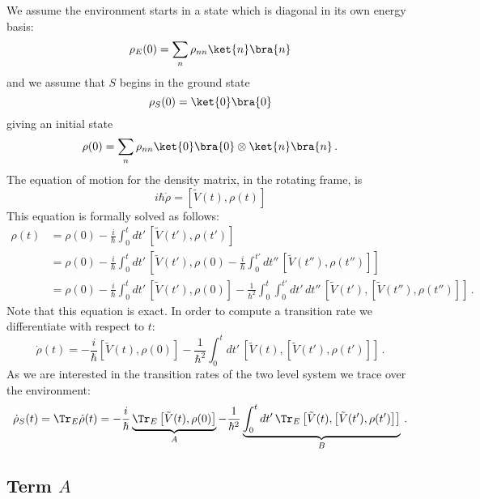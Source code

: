 We assume the environment starts in a state which is diagonal in its own energy basis:
\begin{equation}
\rho_E(0) = \sum_n \rho_{nn} \ket{n}\bra{n}
\end{equation}
and we assume that $S$ begins in the ground state
\begin{equation}
\rho_S(0) = \ket{0}\bra{0}
\end{equation}
giving an initial state
\begin{equation}
\rho(0) = \sum_n \rho_{nn} \ket{0}\bra{0} \otimes \ket{n}\bra{n} \, .
\end{equation}
The equation of motion for the density matrix, in the rotating frame, is
\begin{equation}
i \hbar \dot{\rho} = \left[ \tilde{V}(t), \rho(t) \right]
\end{equation}
This equation is formally solved as follows:
\begin{align}
\rho(t)
&= \rho(0) - \frac{i}{\hbar}
\int_0^t dt' \, \left[ \tilde{V}(t'), \rho(t') \right] \\
&= \rho(0) - \frac{i}{\hbar}
\int_0^t dt' \, \left[ \tilde{V}(t'), \rho(0) - \frac{i}{\hbar} \int_0^{t'} dt'' \, \left[ \tilde{V}(t''), \rho(t'') \right] \right] \\
&= \rho(0) - \frac{i}{\hbar} \int_0^{t} dt' \, \left[ \tilde{V}(t'), \rho(0) \right]
- \frac{1}{\hbar^2} \int_0^{t} \int_0^{t'} dt' \, dt'' \, \left[ \tilde{V}(t'), \left[ \tilde{V}(t''), \rho(t'') \right] \right] \, .
\end{align}
Note that this equation is exact.
In order to compute a transition rate we differentiate with respect to $t$:
\begin{equation}
\dot{\rho}(t)
= -\frac{i}{\hbar} \left[ \tilde{V}(t), \rho(0) \right]
- \frac{1}{\hbar^2} \int_0^t dt' \, \left[ \tilde{V}(t), \left[ \tilde{V}(t'), \rho(t') \right] \right] \, .
\end{equation}
As we are interested in the transition rates of the two level system we trace over the environment:
\begin{equation}
\dot{\rho}_S(t) = 
\Tr_E \dot{\rho}(t) =
-\frac{i}{\hbar} \underbrace{ \Tr_E \left[ \tilde{V}(t), \rho(0) \right] }_{A}
- \frac{1}{\hbar^2} \underbrace{ \int_0^t dt' \, \Tr_E \left[ \tilde{V}(t), \left[ \tilde{V}(t'), \rho(t') \right] \right]}_{B} \, .
\end{equation}


\subsection{Term $A$}

